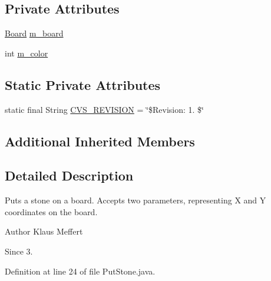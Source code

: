 \subsection*{Private Attributes}
\begin{DoxyCompactItemize}
\item 
\hyperlink{classexamples_1_1gp_1_1tictactoe_1_1_board}{Board} \hyperlink{classexamples_1_1gp_1_1tictactoe_1_1_put_stone_a2247515eb23f68385264f0d1a10c12cd}{m\-\_\-board}
\item 
int \hyperlink{classexamples_1_1gp_1_1tictactoe_1_1_put_stone_ab0037ec9918c65cfa484d2a0d265518e}{m\-\_\-color}
\end{DoxyCompactItemize}
\subsection*{Static Private Attributes}
\begin{DoxyCompactItemize}
\item 
static final String \hyperlink{classexamples_1_1gp_1_1tictactoe_1_1_put_stone_a0fabc5e4f975f6766dbcc034965303cf}{C\-V\-S\-\_\-\-R\-E\-V\-I\-S\-I\-O\-N} = \char`\"{}\$Revision\-: 1. \$\char`\"{}
\end{DoxyCompactItemize}
\subsection*{Additional Inherited Members}


\subsection{Detailed Description}
Puts a stone on a board. Accepts two parameters, representing X and Y coordinates on the board.

\begin{DoxyAuthor}{Author}
Klaus Meffert 
\end{DoxyAuthor}
\begin{DoxySince}{Since}
3. 
\end{DoxySince}


Definition at line 24 of file Put\-Stone.\-java.



